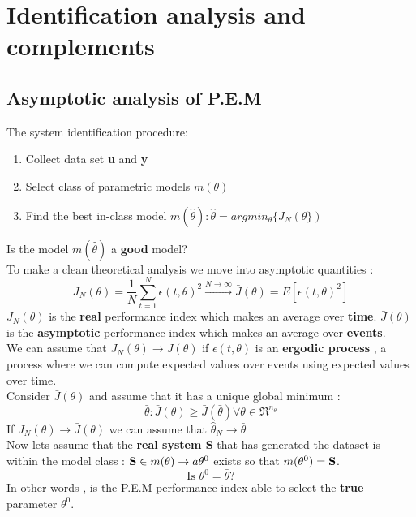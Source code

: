 \section{Identification analysis and complements}
\subsection{Asymptotic analysis of P.E.M}
The system identification procedure:
\begin{enumerate}
\item Collect data set \textbf{u} and \textbf{y}
\item Select class of parametric models $m(\theta)$
\item Find the best in-class model $m(\hat{\theta}) : \hat{\theta}=argmin_{\theta}\{J_N({\theta}\})$
\end{enumerate}
Is the model $m(\hat{\theta})$ a \textbf{good} model?\\
To make a clean theoretical analysis we move into asymptotic quantities :
$$ J_N(\theta)=\frac{1}{N}\sum\limits_{t=1}^{N}\epsilon(t,\theta)^2 \xrightarrow[]{N \to \infty} \bar{J}(\theta)=E[\epsilon(t,\theta)^2]$$
$J_N(\theta)$ is the \textbf{real} performance index which makes an average over \textbf{time}. $\bar{J}(\theta)$ is the \textbf{asymptotic} performance index which makes an average over \textbf{events}.\\
We can assume that $J_N(\theta) \to \bar{J}(\theta)$ if $\epsilon(t,\theta)$ is an \textbf{ergodic process} , a process where we can compute expected values over events  using expected values over time.\\
Consider $\bar{J}(\theta)$ and assume that it has a unique global minimum :
$$ \bar{\theta} : \bar{J}(\theta) \geq \bar{J}(\bar{\theta}) \forall \theta \in \Re^{n_{\theta}}$$
If $J_N(\theta) \to \bar{J}(\theta)$ we can assume that $ \hat{\theta}_N \to \bar{\theta}$\\
Now lets assume that the \textbf{real system S} that has generated the dataset is within the model class : $ \text{\textbf{S}} \in m(\theta) \to a\theta ^0$  exists so that $ m(\theta^0) = \text{\textbf{S}}$.
$$ \text{Is } \theta^0 = \bar{\theta} \text{?}$$
In other words , is the P.E.M performance index able to select the \textbf{true} parameter $\theta^0$.
